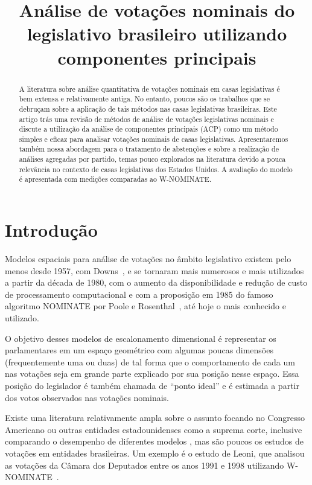 \documentclass[a4paper, 12pt]{article}
\title{Análise de votações nominais do legislativo brasileiro utilizando componentes principais}
\author{}
\date{}
\newcommand\wnominate{W-NOMINATE\xspace}
\begin{document}
 
\maketitle 

\begin{abstract}

A literatura sobre análise quantitativa de votações nominais em casas legislativas é bem extensa e relativamente antiga. No entanto, poucos são os trabalhos que se debruçam sobre a aplicação de tais métodos nas casas legislativas brasileiras. Este artigo trás uma revisão de métodos de análise de votações legislativas nominais e discute a utilização da análise de componentes principais (ACP) como um método simples e eficaz para analisar votações nominais de casas legislativas. Apresentaremos também nossa abordagem para o tratamento de abstenções e sobre a realização de análises agregadas por partido, temas pouco explorados na literatura devido a pouca relevância no contexto de casas legislativas dos Estados Unidos. A avaliação do modelo é apresentada com medições comparadas ao \wnominate.
\end{abstract}

\section{Introdução}
\label{sec:intro}


Modelos espaciais para análise de votações no âmbito legislativo existem pelo menos desde 1957, com Downs~\cite{downs1957}, e se tornaram mais numerosos e mais utilizados a partir da década de 1980, com o aumento da disponibilidade e redução de custo de processamento computacional e com a proposição em 1985 do famoso algoritmo NOMINATE por Poole e Rosenthal~\cite{poole1985nominate}, até hoje o mais conhecido e utilizado. 

O objetivo desses modelos de escalonamento dimensional é representar os parlamentares em um espaço geométrico com algumas poucas dimensões (frequentemente uma ou duas) de tal forma que o comportamento de cada um nas votações seja em grande parte explicado por sua posição nesse espaço. Essa posição do legislador é também chamada de ``ponto ideal'' e é estimada a partir dos votos observados nas votações nominais.

Existe uma literatura relativamente ampla sobre o assunto focando no Congresso Americano ou outras entidades estadounidenses como a suprema corte, inclusive comparando o desempenho de diferentes modelos 
\cite{poole-rosenthal2000,clinton2004ideal},
mas são poucos os estudos de votações em entidades brasileiras. Um exemplo é o estudo de Leoni, que analisou as votações da Câmara dos Deputados entre os anos 1991 e 1998 utilizando W-NOMINATE~\cite{leoni02cdep}.
\end{document}
